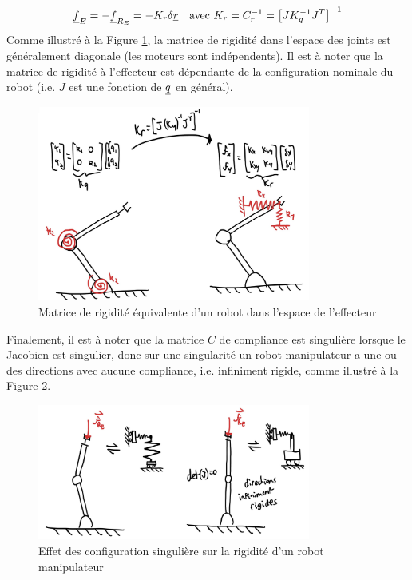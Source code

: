 \begin{align}
\underline{f}_E = -\underline{f}_{R_E} = - K_r \delta \underline{r} \quad \text{avec } K_r = C_r^{-1} = \left[ J K_q^{-1} J^T \right]^{-1}
\end{align}
Comme illustré à la Figure \ref{fig:robotcompliance_effector}, la matrice de rigidité dans l'espace des joints est généralement diagonale (les moteurs sont indépendents). Il est à noter que la matrice de rigidité à l'effecteur est dépendante de la configuration nominale du robot (i.e. $J$ est une fonction de $\underline{q}$ en général).
\begin{figure}[htbp]
	\centering
		\includegraphics[width=0.80\textwidth]{fig/robotcompliance_effector.jpg}
	\caption{Matrice de rigidité équivalente d'un robot dans l'espace de l'effecteur}
	\label{fig:robotcompliance_effector}
\end{figure}
%
Finalement, il est à noter que la matrice $C$ de compliance est singulière lorsque le Jacobien est singulier, donc sur une singularité un robot manipulateur a une ou des directions avec aucune compliance, i.e. infiniment rigide, comme illustré à la Figure \ref{fig:robotcompliance_singular}.
\begin{figure}[htbp]
	\centering
		\includegraphics[width=0.80\textwidth]{fig/robotcompliance_singular.jpg}
	\caption{Effet des configuration singulière sur la rigidité d'un robot manipulateur}
	\label{fig:robotcompliance_singular}
\end{figure}

